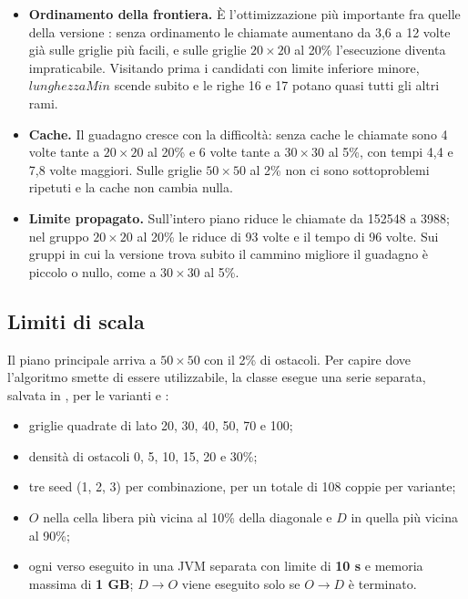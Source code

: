 \begin{itemize}
  \item \textbf{Ordinamento della frontiera.} È l'ottimizzazione più
        importante fra quelle della versione : senza ordinamento le
        chiamate aumentano da 3,6 a 12 volte già sulle griglie più facili, e
        sulle griglie $20\times20$ al 20\% l'esecuzione diventa
        impraticabile. Visitando prima i candidati con limite inferiore
        minore, $\mathit{lunghezzaMin}$ scende subito e le righe 16 e 17
        potano quasi tutti gli altri rami.
  \item \textbf{Cache.} Il guadagno cresce con la difficoltà: senza cache le
        chiamate sono 4 volte tante a $20\times20$ al 20\% e 6 volte tante a
        $30\times30$ al 5\%, con tempi 4,4 e 7,8 volte maggiori. Sulle
        griglie $50\times50$ al 2\% non ci sono sottoproblemi ripetuti e la
        cache non cambia nulla.
  \item \textbf{Limite propagato.} Sull'intero piano riduce le chiamate da
        \num{152548} a \num{3988}; nel gruppo $20\times20$ al 20\% le riduce
        di 93 volte e il tempo di 96 volte. Sui gruppi in cui la versione
         trova subito il cammino migliore il guadagno è piccolo o
        nullo, come a $30\times30$ al 5\%.
\end{itemize}

\subsection{Limiti di scala}
\label{sec:limiti-scala}

Il piano principale arriva a $50\times50$ con il 2\% di ostacoli. Per capire
dove l'algoritmo smette di essere utilizzabile, la classe 
esegue una serie separata, salvata in ,
per le varianti  e :

\begin{itemize}
  \item griglie quadrate di lato 20, 30, 40, 50, 70 e 100;
  \item densità di ostacoli 0, 5, 10, 15, 20 e 30\%;
  \item tre seed (1, 2, 3) per combinazione, per un totale di 108 coppie per
        variante;
  \item $O$ nella cella libera più vicina al 10\% della diagonale e $D$ in
        quella più vicina al 90\%;
  \item ogni verso eseguito in una JVM separata con limite di \textbf{10 s}
        e memoria massima di \textbf{1 GB}; $D \to O$ viene eseguito solo se
        $O \to D$ è terminato.
\end{itemize}

